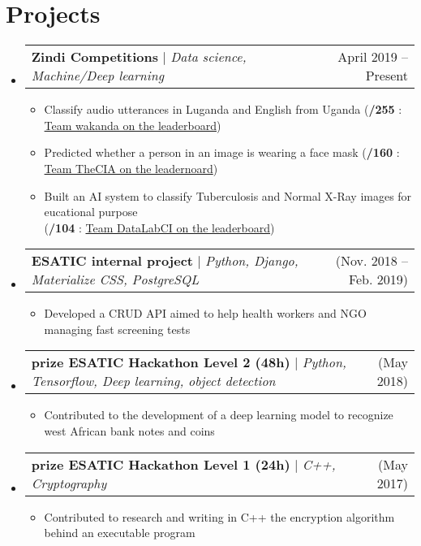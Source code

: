 \documentclass[letterpaper,11pt]{article}
\makeatletter
\newcommand{\resumeItem}[1]{
  \item\small{
    {#1 \vspace{-2pt}}
  }
}
\newcommand{\resumeProjectHeading}[2]{
    \item
    \begin{tabular*}{0.97\textwidth}{l@{\extracolsep{\fill}}r}
      \small#1 & #2 \\
    \end{tabular*}\vspace{-7pt}
}
\newcommand{\resumeSubHeadingListStart}{\begin{itemize}[leftmargin=0.15in, label={}]}
\newcommand{\resumeSubHeadingListEnd}{\end{itemize}}
\newcommand{\resumeItemListStart}{\begin{itemize}}
\newcommand{\resumeItemListEnd}{\end{itemize}\vspace{-5pt}}
\makeatother
\begin{document}
\section{\textbf{Projects} \faLaptop}
    \resumeSubHeadingListStart
    \resumeProjectHeading
        {\textbf{Zindi Competitions} $|$ \emph{Data science, Machine/Deep learning}}{April 2019 -- Present}
        \resumeItemListStart
        \resumeItem{Classify audio utterances in Luganda and English from Uganda (\textbf{\nth{7}/255} : \href{https://zindi.africa/competitions/giz-nlp-agricultural-keyword-spotter/leaderboard}{Team wakanda on the leaderboard}) }
        \resumeItem{Predicted whether a person in an image is wearing a face mask (\textbf{\nth{3}/160} : \href{https://zindi.africa/competitions/spot-the-mask-challenge}{Team TheCIA on the leadernoard}) }
        \resumeItem{Built an AI system to classify Tuberculosis and Normal X-Ray images for eucational purpose \\ \hfill (\textbf{\nth{7}/104} : \href{https://zindi.africa/competitions/runmila-ai-institute-minohealth-ai-labs-tuberculosis-classification-via-x-rays-challenge/leaderboard}{Team DataLabCI on the leaderboard}) }
        \vspace{2pt}
        \resumeItemListEnd

    \resumeProjectHeading
        {\textbf{ESATIC internal project} $|$ \emph{Python, Django, Materialize CSS, PostgreSQL}}{(Nov. 2018 -- Feb. 2019)}
        \resumeItemListStart
        \resumeItem{Developed a CRUD API aimed to help health workers and NGO managing fast screening tests}
    \resumeItemListEnd


      \resumeProjectHeading
          {\textbf{\nth{1} prize ESATIC Hackathon Level 2 (48h)} $|$ \emph{Python, Tensorflow, Deep learning, object detection}}{(May 2018)}
          \resumeItemListStart
            \resumeItem{Contributed to the development of a deep learning model to recognize west African bank notes and coins}
          \resumeItemListEnd

      \resumeProjectHeading
          {\textbf{\nth{1} prize ESATIC Hackathon Level 1 (24h)} $|$ \emph{C++, Cryptography}}{(May 2017)}
          \resumeItemListStart
            \resumeItem{Contributed to research and writing in C++ the encryption algorithm behind an executable program}
          \resumeItemListEnd
    \resumeSubHeadingListEnd



%
\end{document}
